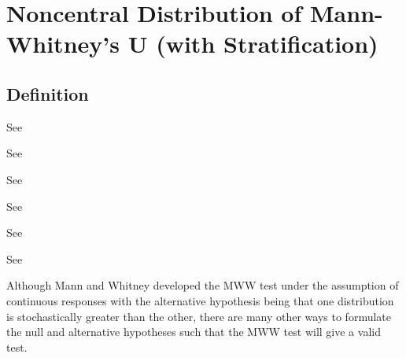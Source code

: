 %
%
%
%
%
%
%
%
%


\newpage
\section{Noncentral Distribution of Mann-Whitney's U (with Stratification)}


\subsection{Definition}
\label{MannWhitneyUDistributionDefinition}

See \cite{Wang_2003_Rank}

See \cite{Mehrotra_2010}

See \cite{Divine_2010}

See \cite{Zhao_2006}

See \cite{Tang_2011}

See \cite{Zhao_2008}

Although Mann and Whitney developed the MWW test under the assumption of continuous responses with the alternative hypothesis being that one distribution is stochastically greater than the other, there are many other ways to formulate the null and alternative hypotheses such that the MWW test will give a valid test.

